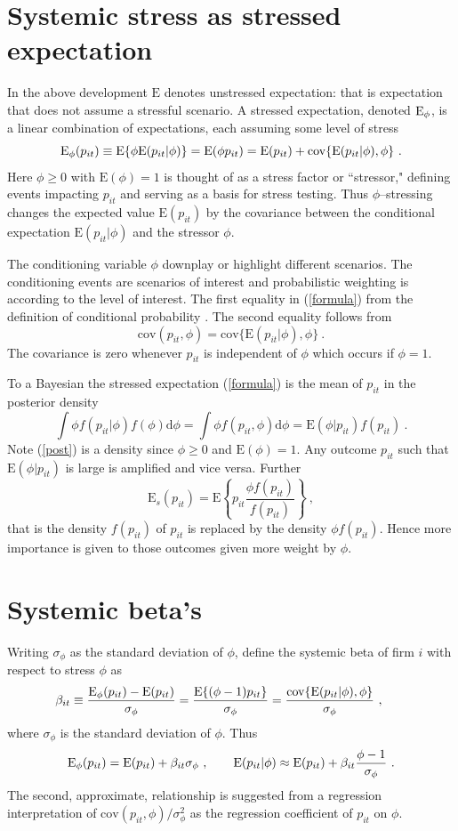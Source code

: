 \documentclass[authoryear]{elsarticle}
\newcommand{\E}{\mathrm{E}}
\newcommand{\cov}{\mathrm{cov}}
\newcommand{\de}{\mathrm{d}}
\newcommand{\eref}[1]{(\ref{#1})}
\newcommand{\cq}{\ , \qquad}
\newcommand{\be}[1]{\begin{equation}\label{#1}}
\newcommand{\ee}{\end{equation}}
\begin{document}
\section{Systemic stress as stressed expectation}

In the above development $\E$  denotes  unstressed expectation:  that is expectation that does not assume a stressful scenario.   A stressed expectation, denoted $\Es$, is a
linear combination of  expectations, each assuming some level of stress
\be{formula}
\Es(p_{it}) \equiv \E\{\phi\E(p_{it}|\phi)\} = \E(\phi p_{it}) = \E(p_{it}) + \cov\{\E(p_{it}|\phi),\phi\}\ .
\ee 
Here $\phi\ge 0$ with $\E(\phi)=1$ is thought of as a stress factor or ``stressor,"  defining events impacting $p_{it}$  and serving as a basis for stress testing.  Thus $\phi$--stressing  changes the expected value $\E(p_{it})$ by the covariance between the conditional expectation $\E(p_{it}|\phi)$  and the stressor $\phi$.

The conditioning variable $\phi$  downplay or highlight different scenarios.  The conditioning events are scenarios of interest and  probabilistic weighting is according to the level of interest.  The first equality in \eref{formula}  from the definition of conditional probability \citep{whittle2000probability}.  The second equality follows from
$$
\cov(p_{it},\phi)=\cov\{\E(p_{it}|\phi),\phi\}\ .
$$
The covariance is zero whenever  $p_{it}$ is independent of $\phi$ which occurs if $\phi=1$.

  To a Bayesian the stressed expectation \eref{formula}  is the mean of $p_{it}$  in  the posterior density
\be{post}
\int \phi f(p_{it}|\phi) f(\phi)\de \phi=\int \phi f(p_{it},\phi)\de \phi= \E(\phi|p_{it})f(p_{it})\ .
\ee
Note \eref{post} is a density since $\phi\ge 0$ and $\E(\phi)=1$.   Any outcome $p_{it}$ such that $\E(\phi|p_{it})$ is large  is amplified and vice versa.   Further
$$
\E_s(p_{it})  = \E\left\{p_{it} \frac{\phi f(p_{it})}{f(p_{it})}\right\}\ ,
$$
that is the density  $f(p_{it})$ of $p_{it}$  is replaced by  the density $\phi f(p_{it})$.  Hence more importance is given to those outcomes given more weight by $\phi$. 


\section{Systemic beta's}
Writing  $\sigma_{\phi}$ as the standard deviation of $\phi$,  define the systemic beta of firm $i$ with respect to stress $\phi$ as
\be{zscore}
\beta_{it}\equiv \frac{\Es(p_{it})- \E(p_{it})}{\sigma_\phi}= \frac{\E\{(\phi-1)p_{it}\}}{\sigma_\phi}= \frac{ \cov\{\E(p_{it}|\phi),\phi\}}{\sigma_\phi} \cq
\ee
where  $\sigma_\phi$ is the standard deviation of $\phi$.  Thus
\be{zscore2}
\Es(p_{it}) = \E(p_{it}) + \beta_{it}\sigma_\phi\cq \E(p_{it}|\phi) \approx \E(p_{it}) + \beta_{it}\frac{\phi-1}{\sigma_\phi}\ .
\ee
The second, approximate, relationship is suggested from  a regression interpretation of $\cov(p_{it},\phi)/\sigma^2_\phi$ as the regression coefficient of $p_{it}$ on $\phi$.
\end{document}
